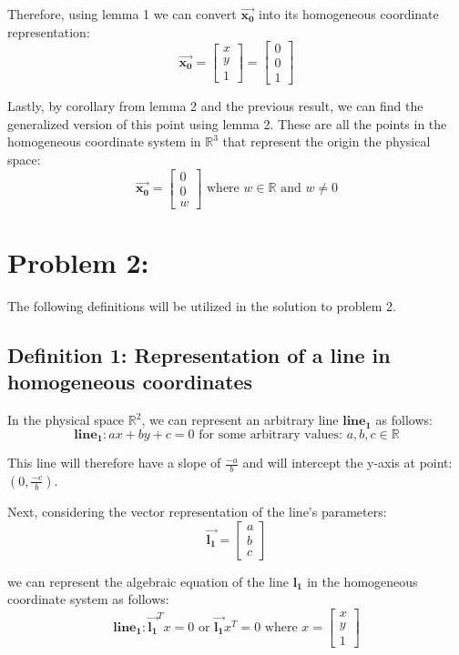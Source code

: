 \documentclass{article}
\begin{document}
Therefore, using lemma 1 we can convert \(\boldsymbol{\Vec{x_0}}\) into its homogeneous coordinate representation: \[\boldsymbol{\Vec{x_0}} = \begin{bmatrix}
    x \\ y \\ 1
\end{bmatrix} = \begin{bmatrix}
    0 \\ 0 \\ 1
\end{bmatrix}\]

Lastly, by corollary from lemma 2 and the previous result, we can find the generalized version of this point using lemma 2. These are all the points in the homogeneous coordinate system in $\mathbb{R}^3$ that represent the origin the physical space:
\[\boldsymbol{\Vec{x_0}} = \begin{bmatrix}
    0 \\ 0 \\ w
\end{bmatrix} \text{ where } w \in \mathbb{R} \text{ and } w \neq 0\]

\newpage
\section*{Problem 2:}
The following definitions will be utilized in the solution to problem 2.

\subsection*{Definition 1: Representation of a line in homogeneous coordinates} 

In the physical space $\mathbb{R}^2$, we can represent an arbitrary line $\boldsymbol{line_1}$ as follows: 
\[\boldsymbol{line_1}: ax + by + c = 0 \text{ for some arbitrary values: } a,b,c \in \mathbb{R}\]

This line will therefore have a slope of $\frac{-a}{b}$ and will intercept the y-axis at point: $(0, \frac{-c}{b})$.

Next, considering the vector representation of the line's parameters: 
\[\boldsymbol{\Vec{l_1}} = \begin{bmatrix}
    a \\ b \\ c
\end{bmatrix}\]

we can represent the algebraic equation of the line $\boldsymbol{l_1}$ in the homogeneous coordinate system as follows: 
\[\boldsymbol{line_1}: \boldsymbol{\Vec{l_1}}^T x = 0 \text{ or } \boldsymbol{\Vec{l_1}} x^T = 0 \text{ where } x = \begin{bmatrix}
    x \\ y \\ 1
\end{bmatrix}\]
\end{document}
